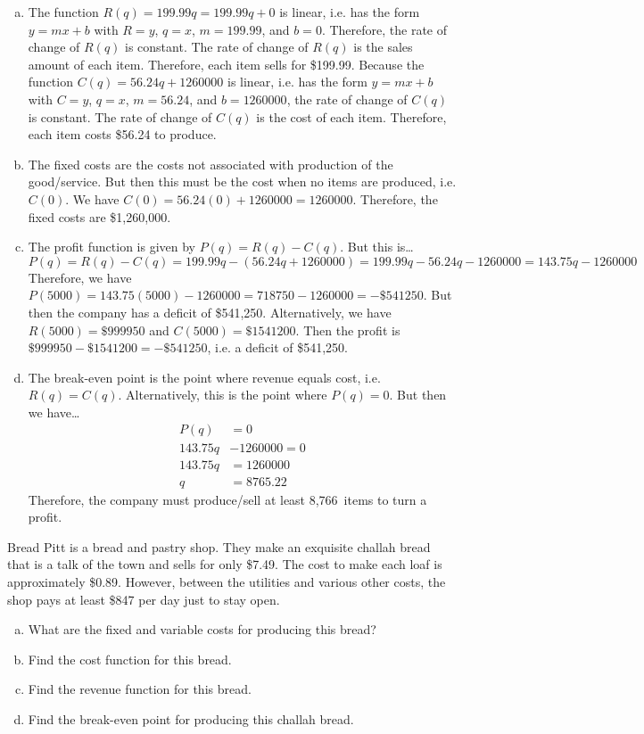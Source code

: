 \documentclass[11pt,letterpaper]{article}
\begin{document}
\sol 
\begin{enumerate}[(a)]
\item The function $R(q)= 199.99q= 199.99q + 0$ is linear, i.e. has the form $y= mx + b$ with $R= y$, $q= x$, $m= 199.99$, and $b= 0$. Therefore, the rate of change of $R(q)$ is constant. The rate of change of $R(q)$ is the sales amount of each item. Therefore, each item sells for \$199.99. Because the function $C(q)= 56.24q + 1260000$ is linear, i.e. has the form $y= mx + b$ with $C= y$, $q= x$, $m= 56.24$, and $b= 1260000$, the rate of change of $C(q)$ is constant. The rate of change of $C(q)$ is the cost of each item. Therefore, each item costs \$56.24 to produce. \pspace

\item The fixed costs are the costs not associated with production of the good/service. But then this must be the cost when no items are produced, i.e. $C(0)$. We have $C(0)= 56.24(0) + 1260000= 1260000$. Therefore, the fixed costs are \$1,260,000. \pspace

\item The profit function is given by $P(q)= R(q) - C(q)$. But this is\dots
	\[
	P(q)= R(q) - C(q)= 199.99q - (56.24q + 1260000)= 199.99q - 56.24q - 1260000= 143.75q - 1260000
	\]
Therefore, we have $P(5000)= 143.75(5000) - 1260000= 718750 - 1260000= -\$541250$. But then the company has a deficit of \$541,250. Alternatively, we have $R(5000)= \$999950$ and $C(5000)= \$1541200$. Then the profit is $\$999950 - \$1541200= -\$541250$, i.e. a deficit of \$541,250. \pspace

\item The break-even point is the point where revenue equals cost, i.e. $R(q)= C(q)$. Alternatively, this is the point where $P(q)= 0$. But then we have\dots
	\[
	\begin{aligned}
	P(q)&= 0 \\[0.3cm]
	143.75q &- 1260000= 0 \\[0.3cm]
	143.75q&= 1260000 \\[0.3cm]
	q&= 8765.22
	\end{aligned}
	\]
Therefore, the company must produce/sell at least 8,766~items to turn a profit. 
\end{enumerate}



\newpage



 Bread Pitt is a bread and pastry shop. They make an exquisite challah bread that is a talk of the town and sells for only \$7.49. The cost to make each loaf is approximately \$0.89. However, between the utilities and various other costs, the shop pays at least \$847 per day just to stay open. 
	\begin{enumerate}[(a)]
	\item What are the fixed and variable costs for producing this bread?
	\item Find the cost function for this bread.
	\item Find the revenue function for this bread.
	\item Find the break-even point for producing this challah bread. 
	\end{enumerate} \pspace
\end{document}
